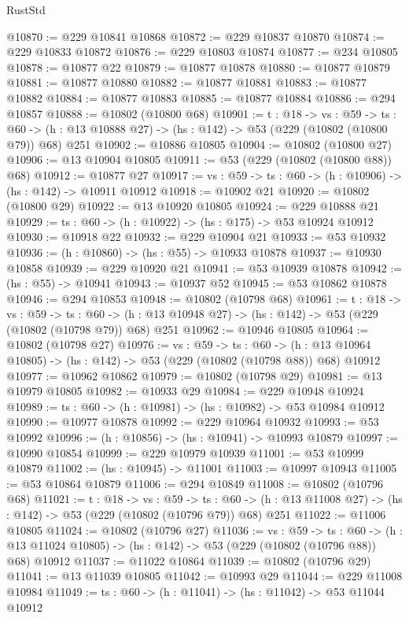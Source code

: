 \begin{lexlean}{RustStd}
\begin{coremodule}
@10870 := @229 @10841 @10868
@10872 := @229 @10837 @10870
@10874 := @229 @10833 @10872
@10876 := @229 @10803 @10874
@10877 := @234 @10805
@10878 := @10877 @22
@10879 := @10877 @10878
@10880 := @10877 @10879
@10881 := @10877 @10880
@10882 := @10877 @10881
@10883 := @10877 @10882
@10884 := @10877 @10883
@10885 := @10877 @10884
@10886 := @294 @10857
@10888 := @10802 (@10800 @68)
@10901 := {t : @18} ->
  {vs : @59} ->
  {ts : @60} -> (h : @13 @10888 @27) -> (hs : @142) -> @53 (@229 (@10802 (@10800 @79)) @68) @251
@10902 := @10886 @10805
@10904 := @10802 (@10800 @27)
@10906 := @13 @10904 @10805
@10911 := @53 (@229 (@10802 (@10800 @88)) @68)
@10912 := @10877 @27
@10917 := {vs : @59} -> {ts : @60} -> (h : @10906) -> (hs : @142) -> @10911 @10912
@10918 := @10902 @21
@10920 := @10802 (@10800 @29)
@10922 := @13 @10920 @10805
@10924 := @229 @10888 @21
@10929 := {ts : @60} -> (h : @10922) -> (hs : @175) -> @53 @10924 @10912
@10930 := @10918 @22
@10932 := @229 @10904 @21
@10933 := @53 @10932
@10936 := (h : @10860) -> (hs : @55) -> @10933 @10878
@10937 := @10930 @10858
@10939 := @229 @10920 @21
@10941 := @53 @10939 @10878
@10942 := (hs : @55) -> @10941
@10943 := @10937 @52
@10945 := @53 @10862 @10878
@10946 := @294 @10853
@10948 := @10802 (@10798 @68)
@10961 := {t : @18} ->
  {vs : @59} ->
  {ts : @60} -> (h : @13 @10948 @27) -> (hs : @142) -> @53 (@229 (@10802 (@10798 @79)) @68) @251
@10962 := @10946 @10805
@10964 := @10802 (@10798 @27)
@10976 := {vs : @59} ->
  {ts : @60} ->
  (h : @13 @10964 @10805) -> (hs : @142) -> @53 (@229 (@10802 (@10798 @88)) @68) @10912
@10977 := @10962 @10862
@10979 := @10802 (@10798 @29)
@10981 := @13 @10979 @10805
@10982 := @10933 @29
@10984 := @229 @10948 @10924
@10989 := {ts : @60} -> (h : @10981) -> (hs : @10982) -> @53 @10984 @10912
@10990 := @10977 @10878
@10992 := @229 @10964 @10932
@10993 := @53 @10992
@10996 := (h : @10856) -> (hs : @10941) -> @10993 @10879
@10997 := @10990 @10854
@10999 := @229 @10979 @10939
@11001 := @53 @10999 @10879
@11002 := (hs : @10945) -> @11001
@11003 := @10997 @10943
@11005 := @53 @10864 @10879
@11006 := @294 @10849
@11008 := @10802 (@10796 @68)
@11021 := {t : @18} ->
  {vs : @59} ->
  {ts : @60} -> (h : @13 @11008 @27) -> (hs : @142) -> @53 (@229 (@10802 (@10796 @79)) @68) @251
@11022 := @11006 @10805
@11024 := @10802 (@10796 @27)
@11036 := {vs : @59} ->
  {ts : @60} ->
  (h : @13 @11024 @10805) -> (hs : @142) -> @53 (@229 (@10802 (@10796 @88)) @68) @10912
@11037 := @11022 @10864
@11039 := @10802 (@10796 @29)
@11041 := @13 @11039 @10805
@11042 := @10993 @29
@11044 := @229 @11008 @10984
@11049 := {ts : @60} -> (h : @11041) -> (hs : @11042) -> @53 @11044 @10912

\end{coremodule}
\end{lexlean}
